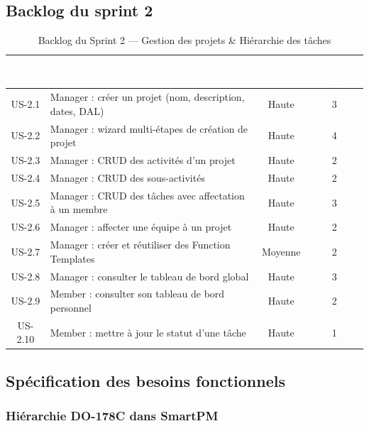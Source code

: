 \subsection{Backlog du sprint 2}

\begin{table}[H]
\centering
\renewcommand{\arraystretch}{1.4}
\begin{tabularx}{\textwidth}{|c|X|c|c|}
\hline
\rowcolor{tablehead}
\textcolor{white}{\textbf{ID}} &
\textcolor{white}{\textbf{User Story}} &
\textcolor{white}{\textbf{Priorit\'e}} &
\textcolor{white}{\textbf{Charge (j)}} \\ \hline
US-2.1 & Manager : cr\'eer un projet (nom, description, dates, DAL) & Haute & 3 \\ \hline
US-2.2 & Manager : wizard multi-\'etapes de cr\'eation de projet & Haute & 4 \\ \hline
US-2.3 & Manager : CRUD des activit\'es d'un projet & Haute & 2 \\ \hline
US-2.4 & Manager : CRUD des sous-activit\'es & Haute & 2 \\ \hline
US-2.5 & Manager : CRUD des t\^aches avec affectation \`a un membre & Haute & 3 \\ \hline
US-2.6 & Manager : affecter une \'equipe \`a un projet & Haute & 2 \\ \hline
US-2.7 & Manager : cr\'eer et r\'eutiliser des Function Templates & Moyenne & 2 \\ \hline
US-2.8 & Manager : consulter le tableau de bord global & Haute & 3 \\ \hline
US-2.9 & Member : consulter son tableau de bord personnel & Haute & 2 \\ \hline
US-2.10 & Member : mettre \`a jour le statut d'une t\^ache & Haute & 1 \\ \hline
\end{tabularx}
\caption{Backlog du Sprint 2 --- Gestion des projets \& Hi\'erarchie des t\^aches}
\label{tab:backlog_s2}
\end{table}

\subsection{Sp\'ecification des besoins fonctionnels}

\subsubsection{Hi\'erarchie DO-178C dans SmartPM}

